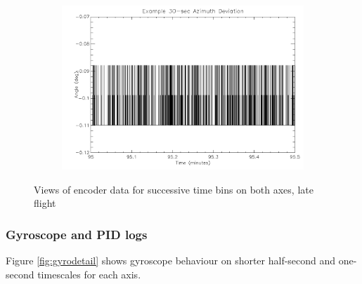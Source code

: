 \begin{figure}[htbp]
\begin{subfigure}{0.45\textwidth}
		\caption{}
		\label{fig:sub:latealt30}
	\end{subfigure}
	\begin{subfigure}{0.45\textwidth}
		\includegraphics[width=1\linewidth]{appendix/img/campaign_results/lateaz30sec.png}
		\caption{}
		\label{fig:sub:lateaz30}
	\end{subfigure}
	\caption{Views of encoder data for successive time bins on both axes, late flight}
	\label{fig:lateflight}
\end{figure}

\newpage
\subsubsection*{Gyroscope and PID logs}

Figure \ref{fig:gyrodetail} shows gyroscope behaviour on shorter half-second and one-second timescales for each axis. 

